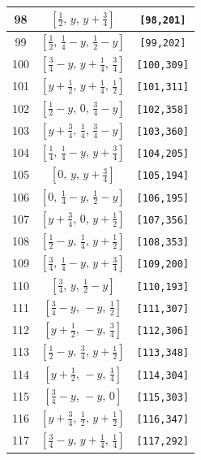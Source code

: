 \documentclass[fleqn,8pt]{jsarticle}
\begin{document}
\begin{longtable}{ccc}
98 & $\left[ \frac{1}{2},\, y,\, y + \frac{3}{4} \right]$ & {\tt [98,201]} \\ \hline
99 & $\left[ \frac{1}{2},\, \frac{1}{4} - y,\, \frac{1}{2} - y \right]$ & {\tt [99,202]} \\ \hline
100 & $\left[ \frac{3}{4} - y,\, y + \frac{1}{4},\, \frac{3}{4} \right]$ & {\tt [100,309]} \\ \hline
101 & $\left[ y + \frac{1}{2},\, y + \frac{1}{4},\, \frac{1}{2} \right]$ & {\tt [101,311]} \\ \hline
102 & $\left[ \frac{1}{2} - y,\, 0,\, \frac{3}{4} - y \right]$ & {\tt [102,358]} \\ \hline
103 & $\left[ y + \frac{3}{4},\, \frac{1}{4},\, \frac{3}{4} - y \right]$ & {\tt [103,360]} \\ \hline
104 & $\left[ \frac{1}{4},\, \frac{1}{4} - y,\, y + \frac{3}{4} \right]$ & {\tt [104,205]} \\ \hline
105 & $\left[ 0,\, y,\, y + \frac{3}{4} \right]$ & {\tt [105,194]} \\ \hline
106 & $\left[ 0,\, \frac{1}{4} - y,\, \frac{1}{2} - y \right]$ & {\tt [106,195]} \\ \hline
107 & $\left[ y + \frac{3}{4},\, 0,\, y + \frac{1}{2} \right]$ & {\tt [107,356]} \\ \hline
108 & $\left[ \frac{1}{2} - y,\, \frac{1}{4},\, y + \frac{1}{2} \right]$ & {\tt [108,353]} \\ \hline
109 & $\left[ \frac{3}{4},\, \frac{1}{4} - y,\, y + \frac{3}{4} \right]$ & {\tt [109,200]} \\ \hline
110 & $\left[ \frac{3}{4},\, y,\, \frac{1}{2} - y \right]$ & {\tt [110,193]} \\ \hline
111 & $\left[ \frac{3}{4} - y,\, - y,\, \frac{1}{2} \right]$ & {\tt [111,307]} \\ \hline
112 & $\left[ y + \frac{1}{2},\, - y,\, \frac{3}{4} \right]$ & {\tt [112,306]} \\ \hline
113 & $\left[ \frac{1}{2} - y,\, \frac{3}{4},\, y + \frac{1}{2} \right]$ & {\tt [113,348]} \\ \hline
114 & $\left[ y + \frac{1}{2},\, - y,\, \frac{1}{4} \right]$ & {\tt [114,304]} \\ \hline
115 & $\left[ \frac{3}{4} - y,\, - y,\, 0 \right]$ & {\tt [115,303]} \\ \hline
116 & $\left[ y + \frac{3}{4},\, \frac{1}{2},\, y + \frac{1}{2} \right]$ & {\tt [116,347]} \\ \hline
117 & $\left[ \frac{3}{4} - y,\, y + \frac{1}{4},\, \frac{1}{4} \right]$ & {\tt [117,292]} \\ \hline

\end{longtable}
\end{document}
